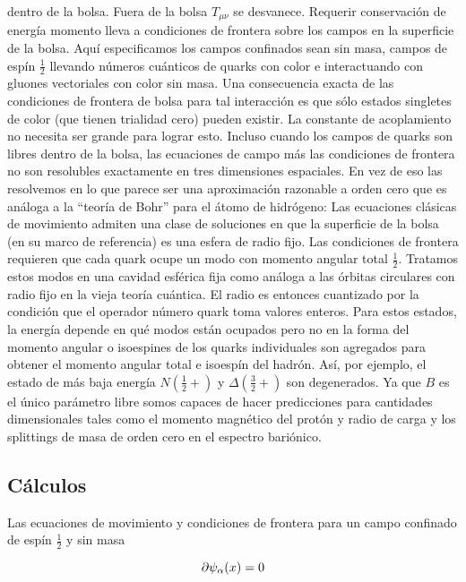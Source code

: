 dentro de la bolsa. Fuera de la bolsa ${T}_{\mu \nu}$ se desvanece. Requerir conservación de energía momento lleva a condiciones de frontera sobre los campos en la superficie de la bolsa. Aquí especificamos los campos confinados sean sin masa, campos de espín $\frac{1}{2}$ llevando números cuánticos de quarks con color e interactuando con gluones vectoriales con color sin masa. Una consecuencia exacta de las condiciones de frontera de bolsa para tal interacción es que sólo estados singletes de color (que tienen trialidad cero) pueden existir. La constante de acoplamiento no necesita ser grande para lograr esto. Incluso cuando los campos de quarks son libres dentro de la bolsa, las ecuaciones de campo más las condiciones de frontera no son resolubles exactamente en tres dimensiones espaciales. En vez de eso las resolvemos en lo que parece ser una aproximación razonable a orden cero que es análoga a la ``teoría de Bohr'' para el átomo de hidrógeno: Las ecuaciones clásicas de movimiento admiten una clase de soluciones en que la superficie de la bolsa (en su marco de referencia) es una esfera de radio fijo. Las condiciones de frontera requieren que cada quark ocupe un modo con momento angular total $\frac{1}{2}$. Tratamos estos modos en una cavidad esférica fija como análoga a las órbitas circulares con radio fijo en la vieja teoría cuántica. El radio es entonces cuantizado por la condición que el operador número quark toma valores enteros. Para estos estados, la energía depende en qué modos están ocupados pero no en la forma del momento angular o isoespines de los quarks individuales son agregados para obtener el momento angular total e isoespín del hadrón. Así, por ejemplo, el estado de más baja energía $N(\frac{1}{2} +)$ y $\Delta(\frac{3}{2} +)$ son degenerados. Ya que $B$ es el único parámetro libre somos capaces de hacer predicciones para cantidades dimensionales tales como el momento magnético del protón y radio de carga y los splittings de masa de orden cero en el espectro bariónico. 

\subsection{Cálculos}

Las ecuaciones de movimiento y condiciones de frontera para un campo confinado de espín $\frac{1}{2}$ y sin masa

\begin{equation}
\sl{\partial} {\psi}_{\alpha}(x) = 0
\end{equation}
 
